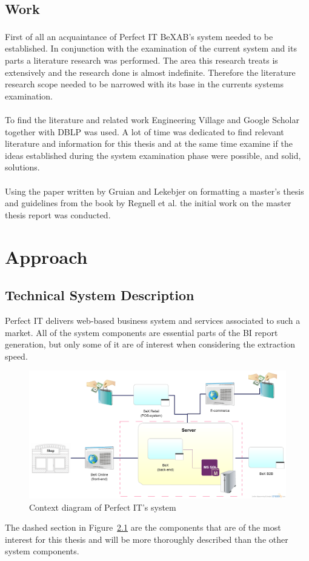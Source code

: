 \documentclass{cslthse-msc}
\newcommand{\bex}{BeX\textsuperscript{\textregistered}}
\begin{document}
\section{Work}
First of all an acquaintance of Perfect IT \bex AB's system needed to be established. In conjunction with the examination of the current system and its parts a literature research was performed. The area this research treats is extensively and the research done is almost indefinite. Therefore the literature research scope needed to be narrowed with its base in the currents systems examination.\\\\    
To find the literature and related work Engineering Village \cite{Enginvillage} and Google Scholar \cite{Googlescholar} together with DBLP \cite{DBLP} was used. A lot of time was dedicated to find relevant literature and information for this thesis and at the same time examine if the ideas established during the system examination phase were possible, and solid, solutions.\\\\
Using the paper written by Gruian and Lekebjer on formatting a master’s thesis \cite{Reportmall} and guidelines from the book by Regnell et al. \cite{regnell} the initial work on the master thesis report was conducted. 

\chapter{Approach}

\section{Technical System Description}
Perfect IT delivers web-based business system and services associated to such a market. All of the system components are essential parts of the BI report generation, but only some of it are of interest when considering the extraction speed.
\begin{figure}[H]
\vspace{-15pt}
  \begin{center}
    \includegraphics[scale=0.3]{Systemdesc.png}
  \end{center}
  \caption{Context diagram of Perfect IT's system}
  \label{context}
  \vspace{-15pt}
\end{figure}
\noindent The dashed section in Figure~\ref{context} are the components that are of the most interest for this thesis and will be more thoroughly described than the other system components.
\end{document}
